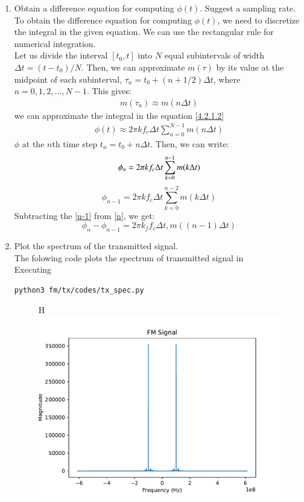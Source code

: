 \begin{enumerate}[label=\arabic*.,ref=\thesection.\theenumi]
\item Obtain a difference equation for computing $\phi(t)$.  Suggest a sampling rate.
\\
\solution 
\quad To obtain the difference equation for computing $\phi(t)$, we need to discretize the integral in the given equation. We can use the rectangular rule for numerical integration.\\ 
Let us divide the interval $[t_0, t]$ into $N$ equal subintervals of width $\Delta t = (t - t_0)/N$. Then, we can approximate $m(\tau)$ by its value at the midpoint of each subinterval, $\tau_n = t_0 + (n + 1/2)\Delta t$, where $n = 0, 1, 2, ..., N-1$. This gives:
\begin{align*}
m(\tau_n) \approx m(n\Delta t)
\end{align*}
we can approximate the integral in the equation \ref{4.2.1.2}
\\
\begin{align*}
\phi(t) \approx 2\pi kf_c \Delta t \sum_{n=0}^{N-1} m(n\Delta t)
\end{align*}
$\phi$ at the $n$th time step $t_n = t_0 + n\Delta t$. Then, we can write:
\begin{equation}
\label{n}
\phi_n = 2\pi kf_c \Delta t \sum_{k=0}^{n-1} m(k\Delta t) \\
\end{equation}
\begin{equation}
\label{n-1}
\phi_{n-1} = 2\pi kf_c \Delta t \sum_{k=0}^{n-2} m(k\Delta t)
\end{equation}
Subtracting the \ref{n-1} from \ref{n}, we get:
\begin{equation}
\phi_n - \phi_{n-1} = 2\pi k_f f_c \Delta t, m((n-1)\Delta t)
\end{equation}
\item Plot the spectrum of the transmitted signal.
\\
\solution
The folowing code plots the spectrum of transmitted signal in 
\\
Executing
\begin{lstlisting}
python3 fm/tx/codes/tx_spec.py
\end{lstlisting}
\begin{figure}{H}
\centering	
\includegraphics[width=\columnwidth]{fm/tx/figs/tx_spec.pdf} 

\end{figure}
\end{enumerate}

